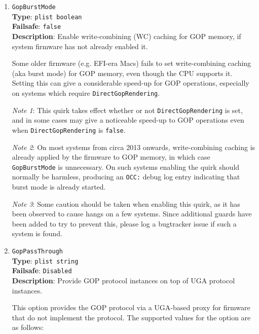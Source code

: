 \documentclass[]{article}
\begin{document}
\begin{enumerate}
  \emph{Note}: This option depends on the \href{https://github.com/acidanthera/OpenCorePkg/blob/master/Include/Acidanthera/Protocol/OcForceResolution.h}{\texttt{OC\_FORCE\_RESOLUTION\_PROTOCOL}}
  protocol being present. This protocol is currently only supported by \texttt{OpenDuetPkg}. The
  \texttt{OpenDuetPkg} implementation currently only supports Intel iGPUs and certain ATI GPUs.

\item
  \texttt{GopBurstMode}\\
  \textbf{Type}: \texttt{plist\ boolean}\\
  \textbf{Failsafe}: \texttt{false}\\
  \textbf{Description}: Enable write-combining (WC) caching for GOP memory, if system firmware has not
  already enabled it.

  Some older firmware (e.g. EFI-era Macs) fails to set write-combining caching (aka burst mode)
  for GOP memory, even though the CPU supports it. Setting this can give a considerable
  speed-up for GOP operations, especially on systems which require \texttt{DirectGopRendering}.

  \emph{Note 1}: This quirk takes effect whether or not \texttt{DirectGopRendering} is set, and
  in some cases may give a noticeable speed-up to GOP operations even when \texttt{DirectGopRendering}
  is \texttt{false}.

  \emph{Note 2}: On most systems from circa 2013 onwards, write-combining
  caching is already applied by the firmware to GOP memory, in which case \texttt{GopBurstMode}
  is unnecessary. On such systems enabling the quirk should normally be harmless, producing an
  \texttt{OCC:} debug log entry indicating that burst mode is already started.

  \emph{Note 3}: Some caution should be taken when enabling this quirk, as it has been observed
  to cause hangs on a few systems. Since additional guards have been added to try to prevent this,
  please log a bugtracker issue if such a system is found.

\item
  \texttt{GopPassThrough}\\
  \textbf{Type}: \texttt{plist\ string}\\
  \textbf{Failsafe}: \texttt{Disabled}\\
  \textbf{Description}: Provide GOP protocol instances on top of UGA protocol instances.

  This option provides the GOP protocol via a UGA-based proxy
  for firmware that do not implement the protocol. The supported values
  for the option are as follows:


\end{enumerate}
\end{document}
